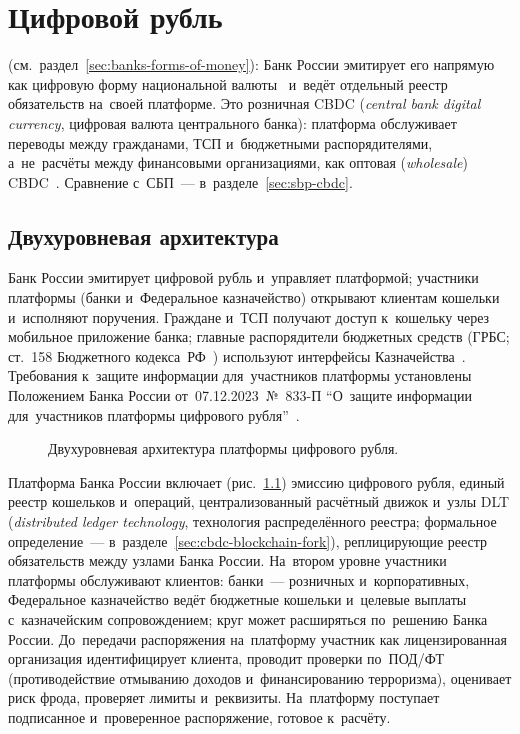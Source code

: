 
\chapter{Цифровой рубль}\label{ch:cbdc}
 (см.~раздел~\ref{sec:banks-forms-of-money}): Банк России
эмитирует его напрямую как цифровую форму национальной
валюты~\cite{fz-340,cbr-digital-ruble} и~ведёт отдельный реестр обязательств
на~своей платформе. Это розничная CBDC (\textit{central bank digital currency},
цифровая валюта центрального банка): платформа обслуживает переводы между
гражданами, ТСП и~бюджетными распорядителями, а~не~расчёты между финансовыми
организациями, как оптовая (\textit{wholesale})
CBDC~\cite{bis-wp880-cbdc-architectures}. Сравнение с~СБП~---
в~разделе~\ref{sec:sbp-cbdc}.

\section{Двухуровневая архитектура}\label{sec:cbdc-architecture}

Банк России эмитирует цифровой рубль и~управляет платформой; участники платформы
(банки и~Федеральное казначейство) открывают клиентам кошельки и~исполняют
поручения. Граждане и~ТСП получают доступ к~кошельку через мобильное приложение
банка; главные распорядители бюджетных средств
(ГРБС; ст.~158 Бюджетного кодекса~РФ~\cite{bk-rf}) используют интерфейсы
Казначейства~\cite{cbr-digital-ruble}. Требования к~защите информации
для~участников платформы установлены Положением Банка России
от~07.12.2023~№~833-П \enquote{О~защите информации для~участников платформы
цифрового рубля}~\cite{cbr-833p}.

\begin{figure}[!ht]
  \centering
  \caption{Двухуровневая архитектура платформы цифрового
  рубля.}\label{fig:cbdc-two-tier}
\end{figure}
\vspace{-4pt}

Платформа Банка России включает (рис.~\ref{fig:cbdc-two-tier}) эмиссию цифрового
рубля, единый реестр кошельков и~операций, централизованный расчётный движок
и~узлы DLT (\textit{distributed ledger technology}, технология распределённого
реестра; формальное определение~--- в~разделе~\ref{sec:cbdc-blockchain-fork}),
реплицирующие реестр обязательств между узлами Банка России. На~втором
уровне участники платформы обслуживают клиентов: банки~--- розничных
и~корпоративных, Федеральное казначейство ведёт бюджетные кошельки и~целевые
выплаты с~казначейским сопровождением; круг может расширяться по~решению Банка
России.
До~передачи распоряжения на~платформу участник как лицензированная организация
идентифицирует клиента, проводит проверки по~ПОД/ФТ (противодействие отмыванию
доходов и~финансированию терроризма), оценивает риск фрода, проверяет
лимиты и~реквизиты.
На~платформу поступает подписанное и~проверенное распоряжение, готовое
к~расчёту.

